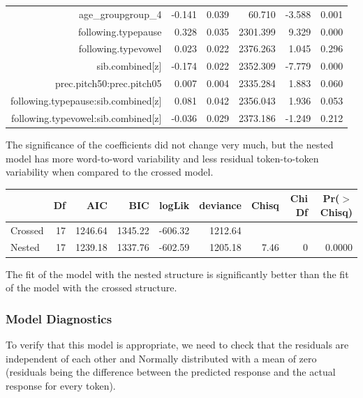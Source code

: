 \documentclass[a4paper]{article}
\begin{document}
{\begin{tabular}{rrrrrr}
$$  age\_groupgroup\_4 & -0.141 & 0.039 & 60.710 & -3.588 & 0.001 \\
  following.typepause & 0.328 & 0.035 & 2301.399 & 9.329 & 0.000 \\
  following.typevowel & 0.023 & 0.022 & 2376.263 & 1.045 & 0.296 \\
  sib.combined[z] & -0.174 & 0.022 & 2352.309 & -7.779 & 0.000 \\
  prec.pitch50:prec.pitch05 & 0.007 & 0.004 & 2335.284 & 1.883 & 0.060 \\
  following.typepause:sib.combined[z] & 0.081 & 0.042 & 2356.043 & 1.936 & 0.053 \\
  following.typevowel:sib.combined[z] & -0.036 & 0.029 & 2373.186 & -1.249 & 0.212 \\
   \hline
\end{tabular}
}\endgroup\newline\newline\newline
The significance of the coefficients did not change very much, but
the nested model has more word-to-word variability and less residual
token-to-token variability when compared to the crossed model.

\begin{table}[ht]
\centering
\begin{tabular}{lrrrrrrrr}
  \hline
 & Df & AIC & BIC & logLik & deviance & Chisq & Chi Df & Pr($>$Chisq) \\
  \hline
Crossed & 17 & 1246.64 & 1345.22 & -606.32 & 1212.64 &  &  &  \\
  Nested & 17 & 1239.18 & 1337.76 & -602.59 & 1205.18 & 7.46 & 0 & 0.0000 \\
   \hline
\end{tabular}
\end{table}
The fit of the model with the nested structure is significantly better
than the fit of the model with the crossed structure.

\subsubsection*{Model Diagnostics}
To verify that this model is appropriate, we need to check that the residuals
are independent of each other and Normally distributed with a mean of
zero (residuals being the difference between the predicted response
and the actual response for every token).
\end{document}
